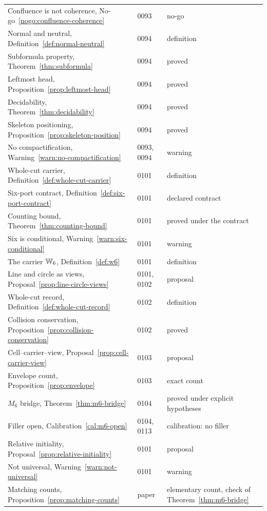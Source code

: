 \begin{longtable}{@{}p{}p{}p{}@{}}
Confluence is not coherence, No-go~\ref{nogo:confluence-coherence} & 0093 & no-go \\
Normal and neutral, Definition~\ref{def:normal-neutral} & 0094 & definition \\
Subformula property, Theorem~\ref{thm:subformula} & 0094 & proved \\
Leftmost head, Proposition~\ref{prop:leftmost-head} & 0094 & proved \\
Decidability, Theorem~\ref{thm:decidability} & 0094 & proved \\
Skeleton positioning, Proposition~\ref{prop:skeleton-position} & 0094 & proved \\
No compactification, Warning~\ref{warn:no-compactification} & 0093, 0094 & warning \\
Whole-cut carrier, Definition~\ref{def:whole-cut-carrier} & 0101 & definition \\
Six-port contract, Definition~\ref{def:six-port-contract} & 0101 & declared contract \\
Counting bound, Theorem~\ref{thm:counting-bound} & 0101 & proved under the contract \\
Six is conditional, Warning~\ref{warn:six-conditional} & 0101 & warning \\
The carrier $\mathbb{W}_6$, Definition~\ref{def:w6} & 0101 & definition \\
Line and circle as views, Proposal~\ref{prop:line-circle-views} & 0101, 0102 & proposal \\
Whole-cut record, Definition~\ref{def:whole-cut-record} & 0102 & definition \\
Collision conservation, Proposition~\ref{prop:collision-conservation} & 0102 & proved \\
Cell--carrier--view, Proposal~\ref{prop:cell-carrier-view} & 0103 & proposal \\
Envelope count, Proposition~\ref{prop:envelope} & 0103 & exact count \\
$M_6$ bridge, Theorem~\ref{thm:m6-bridge} & 0104 & proved under explicit hypotheses \\
Filler open, Calibration~\ref{cal:m6-open} & 0104, 0113 & calibration: no filler \\
Relative initiality, Proposal~\ref{prop:relative-initiality} & 0101 & proposal \\
Not universal, Warning~\ref{warn:not-universal} & 0101 & warning \\
Matching counts, Proposition~\ref{prop:matching-counts} & paper & elementary count, check of
  Theorem~\ref{thm:m6-bridge} \\
\bottomrule
\end{longtable}


